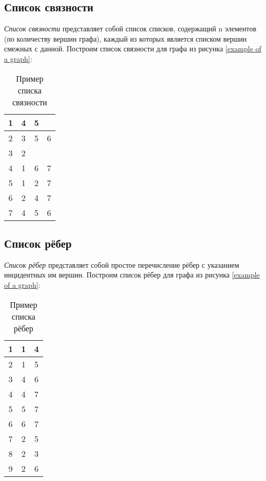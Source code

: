 \subsection{Список связности}

\emph{Список связности} представляет собой список списков, содержащий n 
элементов (по количеству вершин графа), каждый из которых является списком 
вершин смежных с данной. Построим список связности для графа из рисунка 
\ref{example of a graph}:

\begin{table}[h]
	\center
	\begin{tabular}{|c|ccc|}
		\hline
		1 & 4 & 5 &\\
		\hline
		2 & 3 & 5 & 6\\
		\hline
		3 & 2 & &\\
		\hline
		4 & 1 & 6 & 7\\
		\hline
		5 & 1 & 2 & 7\\
		\hline
		6 & 2 & 4 & 7\\
		\hline
		7 & 4 & 5 & 6\\
		\hline
	\end{tabular}
	\caption{Пример списка связности}
\end{table}

\subsection{Список рёбер}

\emph{Список рёбер} представляет собой простое перечисление рёбер с указанием 
инцидентных им вершин. Построим список рёбер для графа из рисунка \ref{example 
of a graph}:

\begin{table}[h]
	\center
	\begin{tabular}{|c|cc|}
		\hline
		1 & 1 & 4\\
		\hline
		2 & 1 & 5\\
		\hline
		3 & 4 & 6\\
		\hline
		4 & 4 & 7\\
		\hline
		5 & 5 & 7\\
		\hline
		6 & 6 & 7\\
		\hline
		7 & 2 & 5\\
		\hline
		8 & 2 & 3\\
		\hline
		9 & 2 & 6\\
		\hline
	\end{tabular}
	\caption{Пример списка рёбер}
\end{table}

